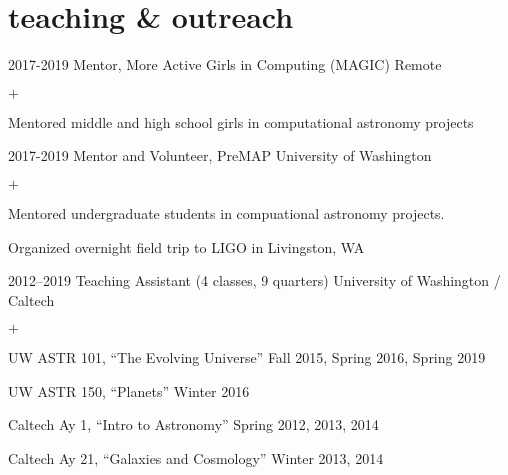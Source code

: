\documentclass[]{luger-cv} %
\begin{document}

\section{teaching \& outreach}

\begin{entrylist}


\entry
{2017-2019}
{Mentor, More Active Girls in Computing (MAGIC)}
{Remote}
{%
\vspace{-1em}
\begin{list}{$+$}{\cvlist}
\item Mentored middle and high school girls in computational astronomy projects
\end{list}
}


\entry
{2017-2019}
{Mentor and Volunteer, PreMAP}
{University of Washington}
{%
\vspace{-1em}
\begin{list}{$+$}{\cvlist}
\item Mentored undergraduate students in compuational astronomy projects.
\item Organized overnight field trip to LIGO in Livingston, WA
\end{list}
}


\entry
{2012--2019}
{Teaching Assistant (4 classes, 9 quarters)}
{University of Washington / Caltech}
{%
\vspace{-1em}
\begin{list}{$+$}{\cvlist}
\item UW ASTR 101, ``The Evolving Universe'' \hfill {\footnotesize Fall 2015, Spring 2016, Spring 2019}
\item UW ASTR 150, ``Planets'' \hfill {\footnotesize Winter 2016}
\item Caltech Ay 1, ``Intro to Astronomy'' \hfill {\footnotesize Spring 2012, 2013, 2014}
\item Caltech Ay 21, ``Galaxies and Cosmology'' \hfill {\footnotesize Winter 2013, 2014}
\end{list}
}


\end{entrylist}
\end{document}
